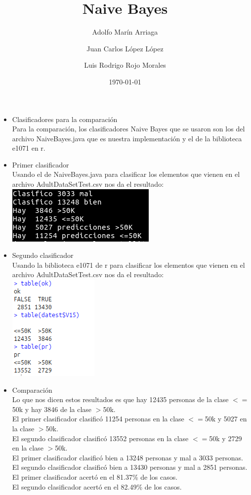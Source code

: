 \documentclass{article}
\title{Naive Bayes}
\author{Adolfo Marín Arriaga \and Juan Carlos López López \and Luis Rodrigo Rojo Morales}
\date{\today\\}
\begin{document}
 \maketitle
 
 \begin{itemize}
  \item Clasificadores para la comparación\\
  Para la comparación, los clasificadores Naive Bayes que se usaron son los del archivo NaiveBayes.java que es nuestra implementación y el de la biblioteca e1071 en r.
  \item Primer clasificador\\
  Usando el de NaiveBayes.java para clasificar los elementos que vienen en el archivo AdultDataSetTest.csv nos da el resultado:\\
  \includegraphics[scale=1]{nbjava}
  \item Segundo clasificador\\
  Usando la biblioteca e1071 de r para clasificar los elementos que vienen en el archivo AdultDataSetTest.csv nos da el resultado:\\
  \includegraphics[scale=1]{nbr}\\
  \item Comparación\\
  Lo que nos dicen estos resultados es que hay 12435 personas de la clase $<=$50k y hay 3846 de la clase $>$50k.\\
  El primer clasificador clasificó 11254 personas en la clase $<=$50k y 5027 en la clase $>$50k.\\
  El segundo clasificador clasificó 13552 personas en la clase $<=$50k y 2729 en la clase $>$50k.\\
  El primer clasificador clasificó bien a 13248 personas y mal a 3033 personas.\\
  El segundo clasificador clasificó bien a 13430 personas y mal a 2851 personas.\\
  El primer clasificador acertó en el 81.37\% de los casos.\\
  El segundo clasificador acertó en el 82.49\% de los casos.\\
 \end{itemize}
 
\end{document}
